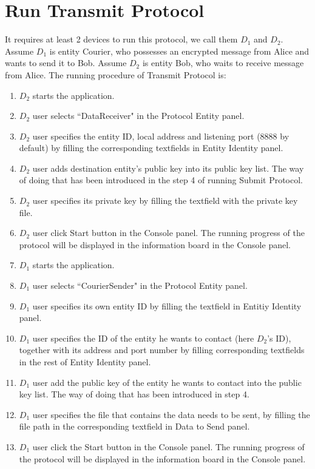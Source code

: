 \section{Run Transmit Protocol}
It requires at least 2 devices to run this protocol, we call them $ D_1 $ and $ D_2 $. Assume $ D_1 $ is entity Courier, who possesses an encrypted message from Alice and wants to send it to Bob. Assume $ D_2 $ is entity Bob, who waits to receive message from Alice. The running procedure of Transmit Protocol is:

\begin{enumerate}
\item $ D_2 $ starts the application.

\item $ D_2 $ user selects ``DataReceiver" in the Protocol Entity panel.

\item $ D_2 $ user specifies the entity ID, local address and listening port (8888 by default) by filling the corresponding textfields in Entity Identity panel.

\item $ D_2 $ user adds destination entity's public key into its public key list. The way of doing that has been introduced in the step 4 of running Submit Protocol.

\item $ D_2 $ user specifies its private key by filling the textfield with the private key file.

\item $ D_2 $ user click Start button in the Console panel. The running progress of the protocol will be displayed in the information board in the Console panel.

\item $ D_1 $ starts the application.

\item $ D_1 $ user selects ``CourierSender" in the Protocol Entity panel.

\item $ D_1 $ user specifies its own entity ID by filling the textfield in Entitiy Identity panel.

\item $ D_1 $ user specifies the ID of the entity he wants to contact (here $ D_2 $'s ID), together with its address and port number by filling corresponding textfields in the rest of Entity Identity panel.

\item $ D_1 $ user add the public key of the entity he wants to contact into the public key list. The way of doing that has been introduced in step 4.

\item $ D_1 $ user specifies the file that contains the data needs to be sent, by filling the file path in the corresponding textfield in Data to Send panel.

\item $ D_1 $ user click the Start button in the Console panel. The running progress of the protocol will be displayed in the information board in the Console panel.
\end{enumerate}
